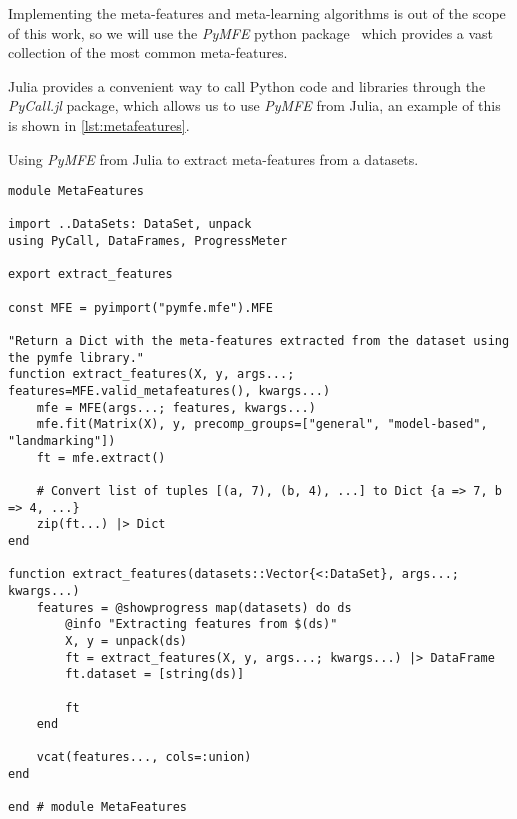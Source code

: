 Implementing the meta-features and meta-learning algorithms is out of the scope
of this work, so we will use the \emph{PyMFE} python
package~\cite{WelcomePyMFEDocumentation,JMLR:v21:19-348} which provides
a vast collection of the most common meta-features.

Julia provides a convenient way to call Python code and libraries through the
\emph{PyCall.jl} package, which allows us to use \emph{PyMFE} from Julia, an
example of this is shown in \cref{lst:metafeatures}.

\begin{listing}
    \caption{Using \emph{PyMFE} from Julia to extract meta-features from a datasets.}%
    \label{lst:metafeatures}
    \begin{verbatim}
module MetaFeatures

import ..DataSets: DataSet, unpack
using PyCall, DataFrames, ProgressMeter

export extract_features

const MFE = pyimport("pymfe.mfe").MFE

"Return a Dict with the meta-features extracted from the dataset using the pymfe library."
function extract_features(X, y, args...; features=MFE.valid_metafeatures(), kwargs...)
    mfe = MFE(args...; features, kwargs...)
    mfe.fit(Matrix(X), y, precomp_groups=["general", "model-based", "landmarking"])
    ft = mfe.extract()

    # Convert list of tuples [(a, 7), (b, 4), ...] to Dict {a => 7, b => 4, ...}
    zip(ft...) |> Dict
end

function extract_features(datasets::Vector{<:DataSet}, args...; kwargs...)
    features = @showprogress map(datasets) do ds
        @info "Extracting features from $(ds)"
        X, y = unpack(ds)
        ft = extract_features(X, y, args...; kwargs...) |> DataFrame
        ft.dataset = [string(ds)]

        ft
    end

    vcat(features..., cols=:union)
end

end # module MetaFeatures
    \end{verbatim}
\end{listing}



